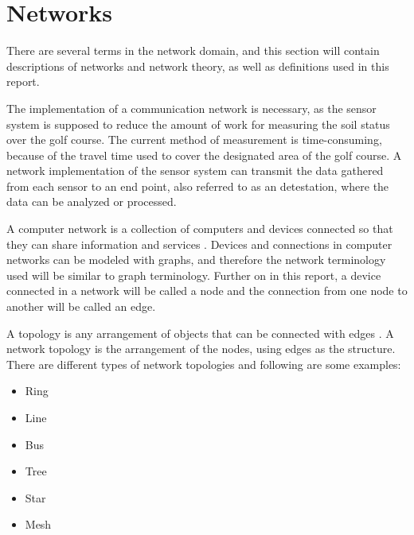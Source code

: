\section{Networks}
There are several terms in the network domain, and this section will contain descriptions of networks and network theory, as well as definitions used in this report. 

The implementation of a communication network is necessary, as the sensor system is supposed to reduce the amount of work for measuring the soil status over the golf course. The current method of measurement is time-consuming, because of the travel time used to cover the designated area of the golf course. A network implementation of the sensor system can transmit the data gathered from each sensor to an end point, also referred to as an detestation, where the data can be analyzed or processed.

A computer network is a collection of computers and devices connected so that they can share information and services \cite{mansfield2009computer}. Devices and connections in computer networks can be modeled with graphs, and therefore the network terminology used will be similar to graph terminology. Further on in this report, a device connected in a network will be called a node and the connection from one node to another will be called an edge.



A topology is any arrangement of objects that can be connected with edges \cite[p.~628]{discMath}. A network topology is the arrangement of the nodes, using edges as the structure. There are different types of network topologies and following are some examples:
\begin{itemize}
	\item Ring
	\item Line
	\item Bus
	\item Tree
	\item Star
	\item Mesh
\end{itemize}

